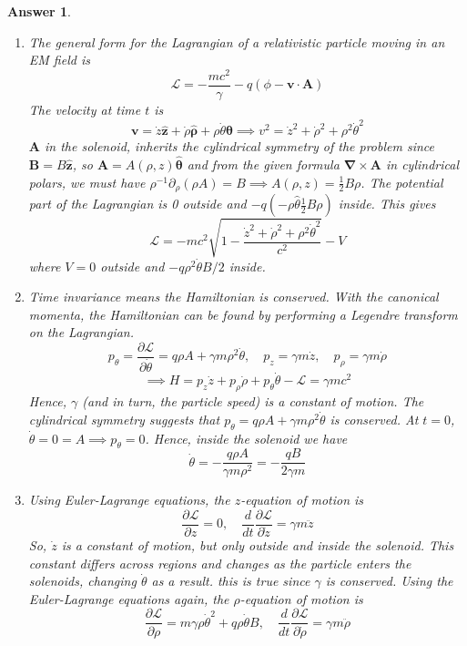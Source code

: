 \documentclass[a4paper]{article}
\newtheorem{ans}{Answer}[section]
\theoremstyle{new}
\begin{document}
\begin{ans}\leavevmode
\begin{enumerate}[label=(\alph*)]
\item The general form for the Lagrangian of a relativistic particle moving in an EM field is
$$\mathcal{L}=-\frac{mc^2}{\gamma}-q(\phi-\mathbf{v}\cdot\mathbf{A})$$
The velocity at time $t$ is
$$\mathbf{v}=\dot{z}\mathbf{\hat{z}}+\dot{\rho}\boldsymbol{\hat{\rho}}+\rho\dot{\theta}\boldsymbol{\hat{\theta}}\implies v^2=\dot{z}^2+\dot{\rho}^2+\rho^2\dot{\theta}^2$$
$\mathbf{A}$ in the solenoid, inherits the cylindrical symmetry of the problem since $\mathbf{B}=B\mathbf{\hat{z}}$, so $\mathbf{A}=A(\rho,z)\boldsymbol{\hat{\theta}}$ and from the given formula $\boldsymbol{\nabla}\times\mathbf{A}$ in cylindrical polars, we must have $\rho^{-1}\partial_\rho(\rho A)=B\implies A(\rho,z)=\frac{1}{2}B\rho$. The potential part of the Lagrangian is 0 outside and $-q(-\rho\hat{\theta}\frac{1}{2}B\rho)$ inside. This gives 
$$\mathcal{L}=-mc^2\sqrt{1-\frac{\dot{z}^2+\dot{\rho}^2+\rho^2\dot{\theta}^2}{c^2}}-V$$
where $V=0$ outside and $-q\rho^2\dot{\theta}B/2$ inside.
\item Time invariance means the Hamiltonian is conserved. With the canonical momenta, the Hamiltonian can be found by performing a Legendre transform on the Lagrangian.
$$p_\theta=\frac{\partial\mathcal{L}}{\partial\dot{\theta}}=q\rho A+\gamma m\rho^2\dot{\theta},\quad p_z=\gamma m\dot{z},\quad p_\rho=\gamma m\dot{\rho}$$
$$\implies H=p_z\dot{z}+p_\rho\dot{\rho}+p_\theta\dot{\theta}-\mathcal{L}=\gamma mc^2$$
Hence, $\gamma$ (and in turn, the particle speed) is a constant of motion. The cylindrical symmetry suggests that $p_\theta=q\rho A+\gamma m\rho^2\dot{\theta}$ is conserved. At $t=0$, $\dot{\theta}=0=A\implies p_\theta=0$. Hence, inside the solenoid we have
$$\dot{\theta}=-\frac{q\rho A}{\gamma m\rho^2}=-\frac{qB}{2\gamma m}$$
\item Using Euler-Lagrange equations, the $z$-equation of motion is
$$\frac{\partial\mathcal{L}}{\partial z}=0,\quad \frac{d}{dt}\frac{\partial\mathcal{L}}{\partial\dot{z}}=\gamma m\ddot{z}$$
So, $\dot{z}$ is a constant of motion, but only outside and inside the solenoid. This constant differs across regions and changes as the particle enters the solenoids, changing $\dot{\theta}$ as a result. this is true since $\gamma$ is conserved. Using the Euler-Lagrange equations again, the $\rho$-equation of motion is
$$\frac{\partial\mathcal{L}}{\partial\rho}=m\gamma\rho\dot{\theta}^2+q\rho\dot{\theta}B,\quad\frac{d}{dt}\frac{\partial\mathcal{L}}{\partial\dot{\rho}}=\gamma m\ddot{\rho}$$

\end{enumerate}
\end{ans}
\end{document}
